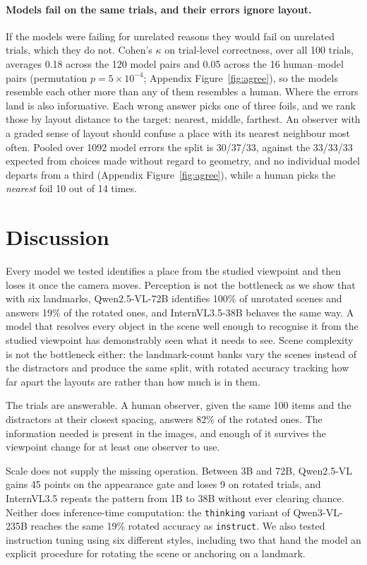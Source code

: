\documentclass{article}
\begin{document}
\paragraph{Models fail on the same trials, and their errors ignore layout.}
If the models were failing for unrelated reasons they would fail on unrelated trials, which they do not. Cohen's $\kappa$ on trial-level correctness, over all 100 trials, averages 0.18 across the 120 model pairs and 0.05 across the 16 human--model pairs (permutation $p=5\times10^{-4}$; Appendix
Figure~\ref{fig:agree}), so the models resemble each other more than any of them resembles a human.  Where the errors land is also informative. Each wrong answer picks one of three foils, and we rank those by layout distance to the target: nearest, middle, farthest. An observer with a graded sense of layout should confuse a place with its nearest neighbour most often. Pooled over 1092 model errors the split is 30/37/33, against the 33/33/33 expected from choices made without regard to geometry, and no individual model departs from a third (Appendix Figure~\ref{fig:agree}), while a human picks the \textit{nearest} foil 10 out of 14 times.

\section{Discussion}

Every model we tested identifies a place from the studied viewpoint and then loses it once the camera moves. Perception is not the bottleneck as we show that with six landmarks, Qwen2.5-VL-72B identifies
100\% of unrotated scenes and answers 19\% of the rotated ones, and InternVL3.5-38B behaves the same way. A model that resolves every object in the scene well enough to recognise it from the studied viewpoint has demonstrably seen what it needs to see. Scene complexity is not the bottleneck either: the landmark-count banks vary the scenes instead of the distractors and produce the same split, with rotated accuracy tracking how far apart the layouts are rather than how much is in them.

The trials are answerable. A human observer, given the same 100 items and the distractors at their closest spacing, answers 82\% of the rotated ones. The information needed is present in the images, and enough of it survives the viewpoint change for at least one observer to use.

Scale does not supply the missing operation. Between 3B and 72B, Qwen2.5-VL gains 45 points on the appearance gate and loses 9 on rotated trials, and InternVL3.5 repeats the pattern from 1B to 38B without ever clearing chance. Neither does inference-time computation: the \texttt{thinking} variant of Qwen3-VL-235B reaches the same 19\% rotated accuracy as \texttt{instruct}. We also tested instruction tuning using six different styles, including two that hand the model an explicit procedure for rotating the scene or anchoring on a landmark. 
\end{document}
